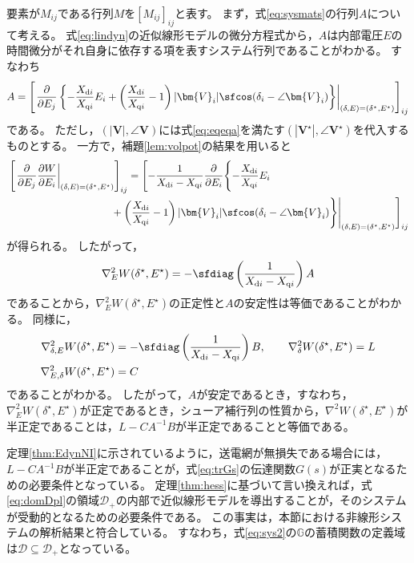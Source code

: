 \documentclass[tombow,dvipdfmx]{corona-a5-1.1}
\begin{document}
\begin{証明}
要素が$M_{ij}$である行列$M$を$[M_{ij}]_{ij}$と表す。
まず，式\ref{eq:sysmats}の行列$A$について考える。
式\ref{eq:lindyn}の近似線形モデルの微分方程式から，$A$は内部電圧$E$の時間微分がそれ自身に依存する項を表すシステム行列であることがわかる。
すなわち
\begin{align*}
A = \left[
\left.
\frac{\partial}{\partial E_j}
\left\{
-\frac{X_{{\rm d}i}}{X_{{\rm q}i}}E_i
+\left(
\frac{X_{{\rm d}i}}{X_{{\rm q}i}}-1
\right)
|\bm{V}_i| \sfcos (\delta_i - \angle \bm{V}_i ) 
\right\}
\right|_{(\delta,E)=(\delta^{\star},E^{\star})}
\right]_{ij}
\end{align*}
である。
ただし，$(|\bm{V}|,\angle \bm{V})$には式\ref{eq:eqeqa}を満たす$(|\bm{V}^{\star}|,\angle \bm{V}^{\star})$を代入するものとする。
一方で，補題\ref{lem:volpot}の結果を用いると
\begin{align*}
&\left[
\left.
\frac{\partial}{\partial E_j}
\frac{\partial W}{\partial E_i}
\right|_{(\delta,E)=(\delta^{\star},E^{\star})}
\right]_{ij}
=
\Biggl[
\Biggl.
-\frac{1}{X_{{\rm d}i} - X_{{\rm q}i}}
\frac{\partial}{\partial E_i}
\Biggl\{
-\frac{X_{{\rm d}i}}{X_{{\rm q}i}}E_i
\\
&\hspace{10em}
+\left(
\frac{X_{{\rm d}i}}{X_{{\rm q}i}}-1
\right)
|\bm{V}_i| \sfcos (\delta_i - \angle \bm{V}_i ) 
\Biggr\}
\Biggr|_{(\delta,E)=(\delta^{\star},E^{\star})}
\Biggr]_{ij}
\end{align*}
が得られる。
したがって，
\begin{align*}
\nabla^2_{E} W(\delta^{\star}, E^{\star})
= 
-\sfdiag\left(
\frac{1}{X_{{\rm d}i} - X_{{\rm q}i}}
\right)
A
\end{align*}
であることから，$\nabla^2_{E} W(\delta^{\star}, E^{\star})$の正定性と$A$の安定性は等価であることがわかる。
同様に，
\begin{align*}
\nabla^2_{\delta,E} W(\delta^{\star}, E^{\star})
&=
-\sfdiag\left(
\frac{1}{X_{{\rm d}i} - X_{{\rm q}i}}
\right)
B,
\qquad
\nabla^2_{\delta} W(\delta^{\star}, E^{\star})
=L
\\
\nabla^2_{E,\delta} W(\delta^{\star}, E^{\star})
& =
C
\end{align*}
であることがわかる。
したがって，$A$が安定であるとき，すなわち，$\nabla^2_{E} W(\delta^{\star}, E^{\star})$が正定であるとき，シューア補行列の性質から，$\nabla^2 W(\delta^{\star}, E^{\star})$が半正定であることは，$L-CA^{-1}B$が半正定であることと等価である。
\end{証明}

定理\ref{thm:EdynNI}に示されているように，送電網が無損失である場合には，$L-CA^{-1}B$が半正定であることが，式\ref{eq:trGs}の伝達関数$G(s)$が正実となるための必要条件となっている。
定理\ref{thm:hess}に基づいて言い換えれば，式\ref{eq:domDpl}の領域$\mathcal{D}_{+}$の内部で近似線形モデルを導出することが，そのシステムが受動的となるための必要条件である。
この事実は，本節における非線形システムの解析結果と符合している。
すなわち，式\ref{eq:sys2}の$\mathds{G}$の蓄積関数の定義域は$\mathcal{D}\subseteq \mathcal{D}_{+}$となっている。
\end{document}
